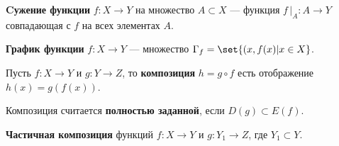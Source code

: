 \documentclass{article}
\begin{document}
\begin{definition}
    \label{def:function-restriction}
    \textbf{Cужение функции} \(f: X \rightarrow Y\) на множество \(A \subset X\) --- функция \(f\,|_A: A \rightarrow Y\) совпадающая с \(f\) на всех элементах \(A\).  
\end{definition}

\begin{definition}
    \label{def:function-graphics}
    \textbf{График функции} \(f: X \rightarrow Y\) --- множество \(\Gamma_f = \set{(x, f(x) | x \in X}\).
\end{definition}

\begin{definition}
    \label{def:composition}
    Пусть \(f: X \rightarrow Y\) и \(g: Y \rightarrow Z\), то \textbf{композиция} \(h = g \circ f\) есть отображение \(h(x) = g(f(x))\).
    
    Композиция считается \textbf{полностью заданной}, если \(D(g) \subset E(f)\). 
    
    \textbf{Частичная композиция} функций \(f: X \rightarrow Y\) и \(g: Y_1 \rightarrow Z\), где \(Y_1 \subset Y\).
\end{definition}
\end{document}
